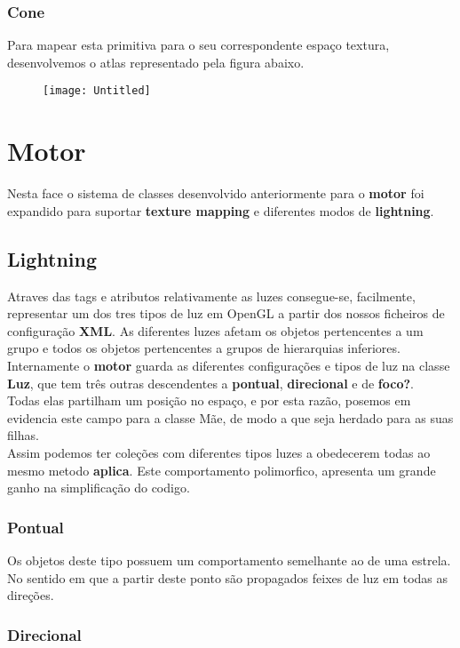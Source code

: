 \documentclass{article}
\begin{document}
\subsubsection{ Cone } 
Para mapear esta primitiva para o seu correspondente espaço textura, desenvolvemos o atlas representado pela figura abaixo.
\begin{figure}[H]
	\centering
	\texttt{[image: Untitled]}
\end{figure}

\section{Motor}
Nesta face o sistema de classes desenvolvido anteriormente para o \textbf{motor} foi expandido para suportar \textbf{texture mapping} e diferentes modos de \textbf{lightning}. 
\subsection{Lightning}

Atraves das tags e atributos relativamente as luzes consegue-se, facilmente, representar um dos tres tipos de luz em OpenGL a partir dos nossos ficheiros de configuração \textbf{XML}.
As diferentes luzes afetam os objetos pertencentes a um grupo e todos os objetos pertencentes a grupos de hierarquias inferiores.
Internamente o \textbf{motor} guarda as diferentes configurações e tipos de luz na classe \textbf{Luz}, que tem três outras descendentes a \textbf{pontual}, \textbf{direcional} e de \textbf{foco?}.\\
Todas elas partilham um posição no espaço, e por esta razão, posemos em evidencia este campo para a classe Mãe, de modo a que seja herdado para as suas filhas.\\
Assim podemos ter coleções com diferentes tipos luzes a obedecerem todas ao mesmo metodo \textbf{aplica}. Este comportamento polimorfico, apresenta um grande ganho na simplificação do codigo.
 
\subsubsection{Pontual}
Os objetos deste tipo possuem um comportamento semelhante ao de uma estrela. No sentido em que a partir deste ponto são propagados feixes de luz em todas as direções.

\subsubsection{Direcional}
\end{document}
